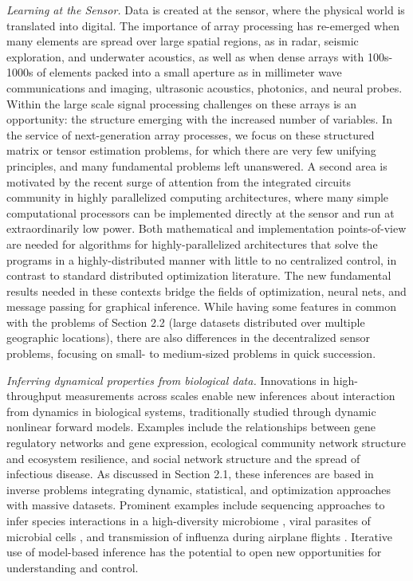 \documentclass[12pt]{article}
\begin{document}
{\it Learning at the Sensor.}
Data is created at the sensor, where the physical world is translated into digital. The importance of array processing has re-emerged when
 many elements are spread over large spatial regions, as in radar, seismic exploration, and underwater acoustics, as well as when dense arrays with 100s-1000s of elements packed into a small aperture as in millimeter wave communications and imaging, ultrasonic acoustics, photonics, and neural probes.
Within the large scale signal processing challenges on these arrays is an opportunity:  the structure emerging with the increased number of variables.  In the service of next-generation array processes,  we focus on these structured matrix or tensor estimation problems, for which there are very few unifying principles, and many fundamental problems left unanswered.  A second area is motivated by the recent surge of attention from the integrated circuits community in highly parallelized computing architectures, where many simple computational processors can be implemented directly at the sensor and run at extraordinarily low power.
 Both mathematical and implementation points-of-view are needed for algorithms for highly-parallelized architectures that
 solve the programs in a highly-distributed manner with little to no centralized control,  in contrast to standard distributed optimization literature. The new fundamental results needed in these contexts bridge the fields of optimization, neural nets, and message passing for graphical inference.
%
While having some features in common with the problems of Section 2.2 (large datasets distributed over multiple geographic locations),  there are also differences in the decentralized sensor problems,  focusing on small- to medium-sized problems in quick succession.


{\it Inferring dynamical properties from biological data.}
 Innovations in high-throughput
measurements  across scales enable new inferences about
interaction from dynamics in biological systems, traditionally studied through dynamic nonlinear forward models.
 Examples include the relationships
between gene regulatory networks and gene expression, ecological community
network structure and ecosystem resilience, and social network structure
and the spread of infectious disease. As discussed in Section 2.1, these inferences are based in inverse problems   integrating dynamic, statistical, and optimization approaches
with massive datasets.  Prominent examples include sequencing approaches to
infer species interactions in a high-diversity microbiome \cite{Stein-Ecological}, viral parasites of microbial cells \cite{Jover-Inferring-Phage}, and transmission of influenza during airplane flights \cite{vickisubtransmission}. Iterative use of
model-based inference has the potential to open new opportunities for
understanding and control.
\end{document}
